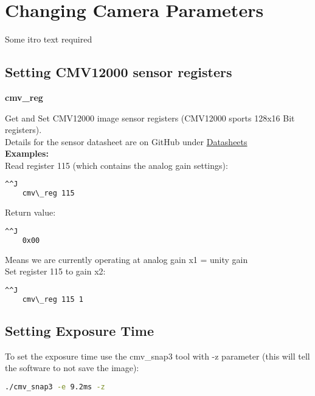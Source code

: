 \section{Changing Camera Parameters}

Some itro text required\\

\subsection{Setting CMV12000 sensor registers}

\textbf{cmv\_reg}

Get and Set CMV12000 image sensor registers (CMV12000 sports 128x16 Bit registers).\\

Details for the sensor datasheet are on GitHub under \href{https://github.com/apertus-open-source-cinema/beta-hardware/tree/master/Datasheets}{Datasheets}\\

\textbf{Examples:}\\

Read register 115 (which contains the analog gain settings): 

\newcommand{\consoleCommand}[1]{
	\begin{lstlisting}[language=bash,morekeywords=$,keywordstyle=\bfseries,frame=none,xleftmargin=.25in,belowskip=2em, aboveskip=2em]^^J
	#1
	\end{lstlisting}
}

\consoleCommand{cmv\_reg 115}

Return value:
\consoleCommand{0x00} 

Means we are currently operating at analog gain x1 = unity gain\\

Set register 115 to gain x2: 
\consoleCommand{cmv\_reg 115 1}

\subsection{Setting Exposure Time}

To set the exposure time use the cmv\_snap3 tool with -z parameter (this will tell the software to not save the image): 

\begin{lstlisting}[language=bash,morekeywords=$,keywordstyle=\bfseries,frame=none,xleftmargin=.25in,belowskip=2em, aboveskip=2em]
./cmv_snap3 -e 9.2ms -z
\end{lstlisting}

